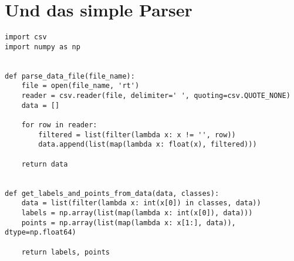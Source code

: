 \section*{Und das simple Parser}

\begin{lstlisting}[style=py]
import csv
import numpy as np


def parse_data_file(file_name):
    file = open(file_name, 'rt')
    reader = csv.reader(file, delimiter=' ', quoting=csv.QUOTE_NONE)
    data = []

    for row in reader:
        filtered = list(filter(lambda x: x != '', row))
        data.append(list(map(lambda x: float(x), filtered)))

    return data


def get_labels_and_points_from_data(data, classes):
    data = list(filter(lambda x: int(x[0]) in classes, data))
    labels = np.array(list(map(lambda x: int(x[0]), data)))
    points = np.array(list(map(lambda x: x[1:], data)), dtype=np.float64)

    return labels, points

\end{lstlisting}



